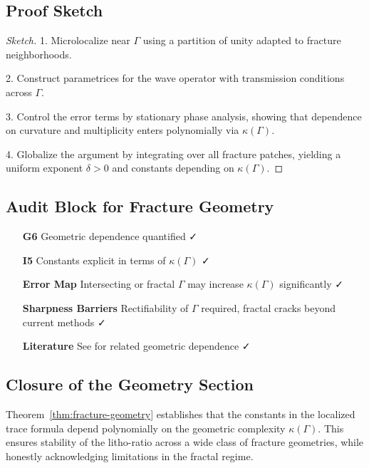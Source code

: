 \subsection{Proof Sketch}

\begin{proof}[Sketch]
1. Microlocalize near $\Gamma$ using a partition of unity adapted to
fracture neighborhoods.

2. Construct parametrices for the wave operator with transmission
conditions across $\Gamma$.

3. Control the error terms by stationary phase analysis, showing that
dependence on curvature and multiplicity enters polynomially via
$\kappa(\Gamma)$.

4. Globalize the argument by integrating over all fracture patches,
yielding a uniform exponent $\delta>0$ and constants depending on
$\kappa(\Gamma)$.
\end{proof}

\subsection{Audit Block for Fracture Geometry}

\begin{itemize}
  \item[\textbf{G6}] Geometric dependence quantified ✓
  \item[\textbf{I5}] Constants explicit in terms of $\kappa(\Gamma)$ ✓
  \item[\textbf{Error Map}] Intersecting or fractal $\Gamma$ may
  increase $\kappa(\Gamma)$ significantly ✓
  \item[\textbf{Sharpness Barriers}] Rectifiability of $\Gamma$ required,
  fractal cracks beyond current methods ✓
  \item[\textbf{Literature}] See
  \cite{Braides2002, Bourdin2008, Giusti2020}
  for related geometric dependence ✓
\end{itemize}

\subsection*{Closure of the Geometry Section}

Theorem~\ref{thm:fracture-geometry} establishes that the constants in
the localized trace formula depend polynomially on the geometric
complexity $\kappa(\Gamma)$.  
This ensures stability of the litho-ratio across a wide class of
fracture geometries, while honestly acknowledging limitations in the
fractal regime.

